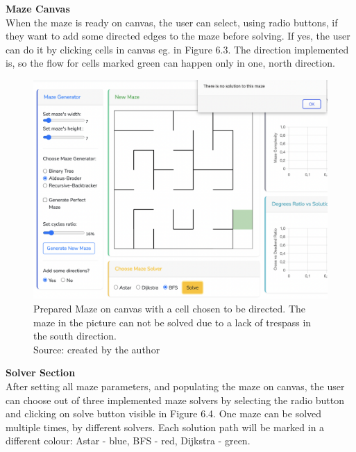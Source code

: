 \newline   
\indent \textbf{Maze Canvas}\\
\indent When the maze is ready on canvas, the user can select, using radio buttons, if they want to add some directed edges to the maze before solving. If yes, the user can do it 
by clicking cells in canvas eg. in Figure 6.3. The direction implemented is, so the flow for cells marked green can happen only in one, north direction.\\
\begin{figure}[!h]
    \centering
    \includegraphics[width=0.6\linewidth]{mazeDirection}
    \caption{Prepared Maze on canvas with a cell chosen to be directed. The maze in the picture can not be solved due to a lack of trespass in the south direction.\\Source: created by the author}
    \end{figure}
\newpage
\indent \textbf{Solver Section}\\
\indent After setting all maze parameters, and populating the maze on canvas, the user can choose out of three implemented maze solvers by selecting the radio button
and clicking on solve button visible in Figure 6.4. One maze can be solved multiple times, by different solvers. Each solution path will be marked in a different colour: 
Astar - blue, BFS - red, Dijkstra - green.\\
